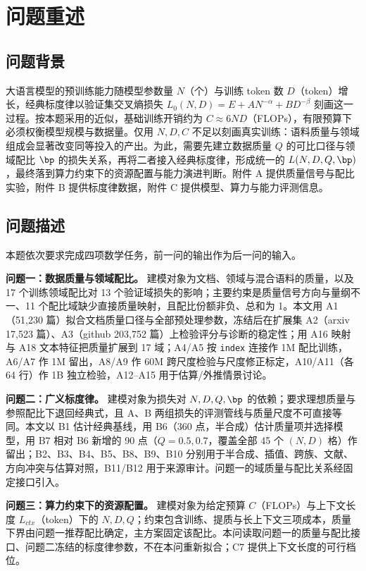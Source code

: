 \section{问题重述}
\label{sec:1}

\subsection{问题背景}
\label{sec:1.1}

大语言模型的预训练能力随模型参数量 $N$（个）与训练 token 数 $D$（token）增长，经典标度律以验证集交叉熵损失 $L_0(N,D)=E+AN^{-\alpha}+BD^{-\beta}$ 刻画这一过程\cite{hoffmann,bahri}。按本题采用的近似，基础训练开销约为 $C\approx 6ND$（FLOPs），有限预算下必须权衡模型规模与数据量。仅用 $N,D,C$ 不足以刻画真实训练：语料质量与领域组成会显著改变同等投入的产出。为此，需要先建立数据质量 $Q$ 的可比口径与领域配比 $\bp$ 的损失关系，再将二者接入经典标度律，形成统一的 $L(N,D,Q,\bp)$，最终落到算力约束下的资源配置与能力演进判断。附件 A 提供质量信号与配比实验，附件 B 提供标度律数据，附件 C 提供模型、算力与能力评测信息。

\subsection{问题描述}
\label{sec:1.2}

本题依次要求完成四项数学任务，前一问的输出作为后一问的输入。

\textbf{问题一：数据质量与领域配比。} 建模对象为文档、领域与混合语料的质量，以及 17 个训练领域配比对 13 个验证域损失的影响；主要约束是质量信号方向与量纲不一、11 个配比域缺少直接质量映射，且配比份额非负、总和为 1。本文用 A1（51,230 篇）拟合文档质量口径与全部预处理参数，冻结后在扩展集 A2（arxiv 17,523 篇）、A3（github 203,752 篇）上检验评分与诊断的稳定性；用 A16 映射与 A18 文本特征把质量扩展到 17 域；A4/A5 按 \texttt{index} 连接作 1M 配比训练，A6/A7 作 1M 留出，A8/A9 作 60M 跨尺度检验与尺度修正标定，A10/A11（各 64 行）作 1B 独立检验，A12–A15 用于估算/外推情景讨论。

\textbf{问题二：广义标度律。} 建模对象为损失对 $N,D,Q,\bp$ 的依赖；要求理想质量与参照配比下退回经典式，且 A、B 两组损失的评测管线与质量尺度不可直接等同。本文以 B1 估计经典基线，用 B6（360 点，半合成）估计质量项并选择模型，用 B7 相对 B6 新增的 90 点（$Q=0.5,0.7$，覆盖全部 45 个 $(N,D)$ 格）作留出；B2、B3、B4、B5、B8、B9、B10 分别用于半合成、插值、跨族、文献、方向冲突与估算对照，B11/B12 用于来源审计。问题一的域质量与配比关系经固定接口引入。

\textbf{问题三：算力约束下的资源配置。} 建模对象为给定预算 $C$（FLOPs）与上下文长度 $L_{ctx}$（token）下的 $N,D,Q$；约束包含训练、提质与长上下文三项成本，质量下界由问题一推荐配比确定，主方案固定该配比。本问读取问题一的质量与配比接口、问题二冻结的标度律参数，不在本问重新拟合；C7 提供上下文长度的可行档位。

